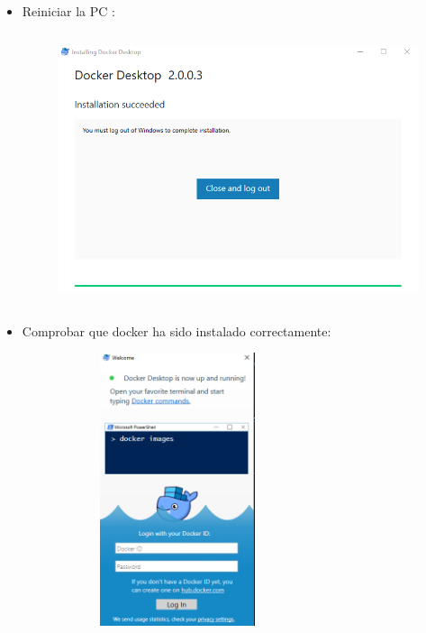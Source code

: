 \begin{itemize}
	\item Reiniciar la PC :\\
	\begin{figure}[htb]
	\begin{center}
	\includegraphics[width=18cm, height=8cm]{./Imagenes/dockerre}
	\end{center}
	\end{figure}
	
	\item Comprobar que docker ha sido instalado correctamente:\\	
	\begin{figure}[htb]
	\begin{center}
	\includegraphics[width=7cm, height=8cm]{./Imagenes/dockerrun}
	\end{center}
	\end{figure}\\\\\\\\		
		

\end{itemize}
